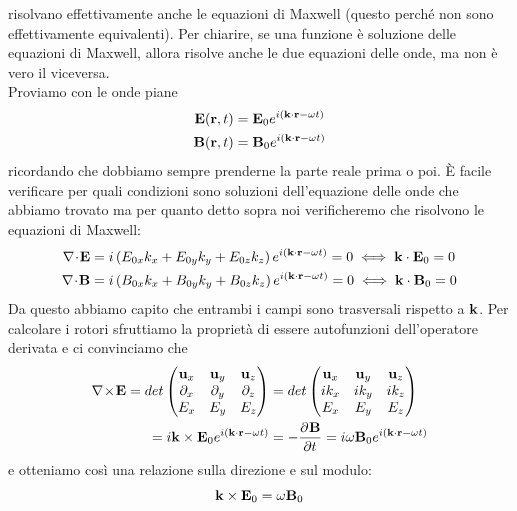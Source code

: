 risolvano effettivamente anche le equazioni di Maxwell (questo perché non sono effettivamente equivalenti). Per chiarire, se una funzione è soluzione 
delle equazioni di Maxwell, allora risolve anche le due equazioni delle onde, ma non è vero il viceversa.\\
Proviamo con le onde piane
\begin{align} \label{onde piane E,B}
  \mathbf{ E }(\mathbf{ r },t) &= \mathbf{ E }_0 e^{i\left( \mathbf{ k \cdot r } - \omega t \right)}
  \\
  \mathbf{ B }(\mathbf{ r },t) &= \mathbf{ B }_0 e^{i\left( \mathbf{ k \cdot r } - \omega t \right)}
\end{align}
ricordando che dobbiamo sempre prenderne la parte reale prima o poi. È facile verificare per quali condizioni sono soluzioni dell'equazione delle onde 
che abbiamo trovato ma per quanto detto sopra noi verificheremo che risolvono le equazioni di Maxwell:
\begin{align}
  \nabla\!\cdot\!\mathbf{ E } &= i \left( E_{0x}k_x + E_{0y}k_y + E_{0z}k_z \right) e^{i\left( \mathbf{ k \cdot r } - \omega t \right)} = 0 
  \iff \mathbf{ k\cdot E }_0 = 0
  \\
  \nabla\!\cdot\!\mathbf{ B } &= i \left( B_{0x}k_x + B_{0y}k_y + B_{0z}k_z \right) e^{i\left( \mathbf{ k \cdot r } - \omega t \right)} = 0 
  \iff \mathbf{ k \cdot B }_0 = 0
\end{align}
Da questo abbiamo capito che entrambi i campi sono trasversali rispetto a $ \mathbf{ k } $. Per calcolare i rotori sfruttiamo la proprietà di 
essere autofunzioni dell'operatore derivata e ci convinciamo che
\begin{align}
  \nabla\!\times\!\mathbf{ E } = det 
  \begin{pmatrix}
    \mathbf{ u }_x & \mathbf{ u }_y & \mathbf{ u }_z \\
    \partial_x & \partial_y & \partial_z \\
    E_x & E_y & E_z
  \end{pmatrix}
  &= det
    \begin{pmatrix}
    \mathbf{ u }_x & \mathbf{ u }_y & \mathbf{ u }_z \\
    ik_x& ik_y & ik_z \\
    E_x & E_y & E_z
  \end{pmatrix}
  \\= i \mathbf{ k \times E }_0 e^{i\left( \mathbf{ k \cdot r } - \omega t \right)} &= - \frac{\partial^{} { \mathbf{ B }}}{\partial {t}^{}} 
  = i \omega \mathbf{ B }_0 e^{i\left( \mathbf{ k \cdot r } - \omega t \right)}
\end{align}
e otteniamo così una relazione sulla direzione e sul modulo:
\begin{equation}
  \mathbf{ k \times E }_0 = \omega \mathbf{ B }_0
\end{equation}
